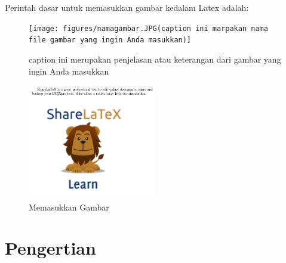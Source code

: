 Perintah dasar untuk memasukkan gambar kedalam Latex adalah:
\begin{figure}[ht]
\centerline{\texttt{[image: figures/namagambar.JPG(caption ini marpakan nama file gambar yang ingin Anda masukkan)]}}
\caption {caption ini merupakan penjelasan atau keterangan dari gambar yang ingin Anda masukkan}
\label{labelgambar}
\end{figure}


\begin{figure}[ht]
	\centerline{\includegraphics[width=0.50\textwidth]{gambar/dapi13.jpg}}
	\caption{Memasukkan Gambar}
	\label{Memasukkan Gambar}
\end{figure}

\section {Pengertian }
